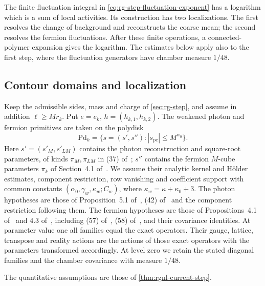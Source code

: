 \documentclass[11pt,letterpaper,reqno]{amsart}
\newcommand{\extref}[2]{#1 of~\cite{#2}}
\newcommand{\exteq}[2]{(#1) of~\cite{#2}}
\begin{document}
The finite fluctuation integral in
\eqref{eq:rg-step-fluctuation-exponent} has a logarithm which is a
sum of local activities. Its construction has two localizations.
The first resolves the change of background and reconstructs
the coarse mean; the second resolves the fermion fluctuations.
After these finite operations, a connected-polymer expansion
gives the logarithm. The estimates below apply also to the first
step, where the fluctuation generators have chamber measure
$1/48$.

\subsection{Contour domains and localization}
\label{subsec:rgnl-domains}

Keep the admissible sides, mass and charge of
\cref{sec:rg-step}, and assume in addition
$\ell\ge Mr_k$. Put $e=e_k$, $h=(h_{k,1},h_{k,2})$.
The weakened photon and fermion primitives are taken on the
polydisk
\[
 \mathrm{Pd}_k=\{s=(s',s''):|s_{\mathrm{pc}}|\le M^{\alpha_0}\}.
\]
Here $s'=(s'_M,s'_{LM})$ contains the photon reconstruction
and square-root parameters, of kinds $\pi_M,\pi_{LM}$ in
\exteq{37}{MaxwellBlockManuscript}; $s''$ contains the
fermion $M$-cube parameters $\pi_k$ of
Section~\extref{4.1}{FermionBlockManuscript}.
We assume their analytic kernel and H\"older estimates,
component restriction, row vanishing and coefficient support
with common constants $(\alpha_0,\gamma_w,\kappa_w;C_w)$,
where $\kappa_w=\kappa+\kappa_0+3$.
The photon hypotheses are those of
Proposition~\extref{5.1}{MaxwellBlockManuscript},
\exteq{42}{MaxwellBlockManuscript} and the component
restriction following them. The fermion hypotheses are those of
Propositions~\extref{4.1}{FermionBlockManuscript} and
\extref{4.3}{FermionBlockManuscript}, including
\exteq{57}{FermionBlockManuscript},
\exteq{58}{FermionBlockManuscript}, and their covariance
identities. At parameter value one all families equal the
exact operators. Their gauge, lattice, transpose and reality
actions are the actions of those exact operators with the
parameters transformed accordingly. At level zero we retain
the stated diagonal families and the chamber covariance
with measure $1/48$.

The quantitative assumptions are those of \cref{thm:rgnl-current-step}.
\end{document}
